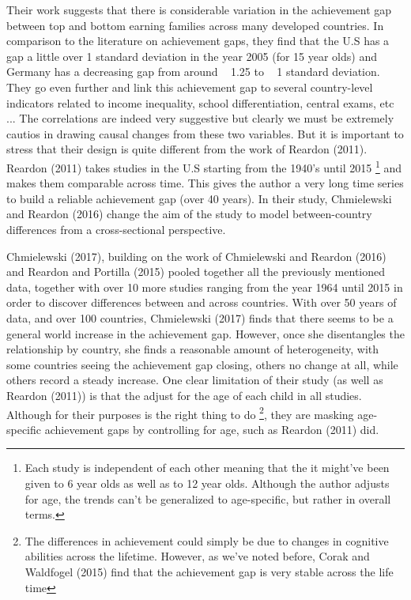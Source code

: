 \documentclass[11pt, a4paper]{article}\usepackage[]{graphicx}\usepackage[]{color}
\begin{document}
Their work suggests that there is considerable variation in the achievement gap between top and bottom earning families across many developed countries. In comparison to the literature on achievement gaps, they find that the U.S has a gap a little over 1 standard deviation in the year 2005 (for 15 year olds) and Germany has a decreasing gap from around ~ 1.25 to ~ 1 standard deviation. They go even further and link this achievement gap to several country-level indicators related to income inequality, school differentiation, central exams, etc ... The correlations are indeed very suggestive but clearly we must be extremely cautios in drawing causal changes from these two variables. But it is important to stress that their design is quite different from the work of Reardon (2011). Reardon (2011) takes studies in the U.S starting from the 1940's until 2015 \footnote{Each study is independent of each other meaning that the it might've been given to 6 year olds as well as to 12 year olds. Although the author adjusts for age, the trends can't be generalized to age-specific, but rather in overall terms.} and makes them comparable across time. This gives the author a very long time series to build a reliable achievement gap (over 40 years). In their study, Chmielewski and Reardon (2016) change the aim of the study to model between-country differences from a cross-sectional perspective.

Chmielewski (2017), building on the work of Chmielewski and Reardon (2016) and Reardon and Portilla (2015) pooled together all the previously mentioned data, together with over 10 more studies ranging from the year 1964 until 2015 in order to discover differences between and across countries. With over 50 years of data, and over 100 countries, Chmielewski (2017) finds that there seems to be a general world increase in the achievement gap. However, once she disentangles the relationship by country, she finds a reasonable amount of heterogeneity, with some countries seeing the achievement gap closing, others no change at all, while others record a steady increase. One clear limitation of their study (as well as Reardon (2011)) is that the adjust for the age of each child in all studies. Although for their purposes is the right thing to do \footnote{The differences in achievement could simply be due to changes in cognitive abilities across the lifetime. However, as we've noted before, Corak and Waldfogel (2015) find that the achievement gap is very stable across the life time}, they are masking age-specific achievement gaps by controlling for age, such as Reardon (2011) did.
\end{document}
